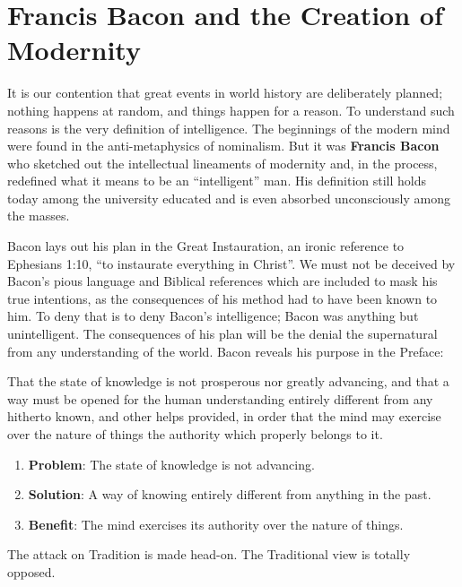 \section{Francis Bacon and the Creation of Modernity}
\label{sec:BaconModernity}
It is our contention that great events in world history are deliberately planned; nothing happens at random, and things happen for a reason. To understand such reasons is the very definition of intelligence. The beginnings of the modern mind were found in the anti-metaphysics of nominalism. But it was \textbf{Francis Bacon} who sketched out the intellectual lineaments of modernity and, in the process, redefined what it means to be an “intelligent” man. His definition still holds today among the university educated and is even absorbed unconsciously among the masses.

Bacon lays out his plan in the Great Instauration, an ironic reference to Ephesians 1:10, “to instaurate everything in Christ”. We must not be deceived by Bacon's pious language and Biblical references which are included to mask his true intentions, as the consequences of his method had to have been known to him. To deny that is to deny Bacon's intelligence; Bacon was anything but unintelligent. The consequences of his plan will be the denial the supernatural from any understanding of the world. Bacon reveals his purpose in the Preface:

\begin{quotex}
That the state of knowledge is not prosperous nor greatly advancing, and that a way must be opened for the human understanding entirely different from any hitherto known, and other helps provided, in order that the mind may exercise over the nature of things the authority which properly belongs to it. 

\end{quotex}
\begin{enumerate}
\item \textbf{Problem}: The state of knowledge is not advancing. 
\item \textbf{Solution}: A way of knowing entirely different from anything in the past. 
\item \textbf{Benefit}: The mind exercises its authority over the nature of things. 
\end{enumerate}
The attack on Tradition is made head-on. The Traditional view is totally opposed.

